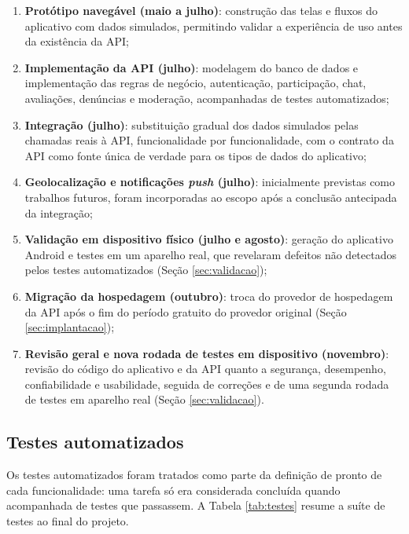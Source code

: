 \documentclass[a4paper, 12pt]{article}
\begin{document}
\begin{justify}
\begin{enumerate}
    \item \textbf{Protótipo navegável (maio a julho)}: construção das telas e fluxos do aplicativo com dados simulados, permitindo validar a experiência de uso antes da existência da API;
    \item \textbf{Implementação da API (julho)}: modelagem do banco de dados e implementação das regras de negócio, autenticação, participação, chat, avaliações, denúncias e moderação, acompanhadas de testes automatizados;
    \item \textbf{Integração (julho)}: substituição gradual dos dados simulados pelas chamadas reais à API, funcionalidade por funcionalidade, com o contrato da API como fonte única de verdade para os tipos de dados do aplicativo;
    \item \textbf{Geolocalização e notificações \textit{push} (julho)}: inicialmente previstas como trabalhos futuros, foram incorporadas ao escopo após a conclusão antecipada da integração;
    \item \textbf{Validação em dispositivo físico (julho e agosto)}: geração do aplicativo Android e testes em um aparelho real, que revelaram defeitos não detectados pelos testes automatizados (Seção \ref{sec:validacao});
    \item \textbf{Migração da hospedagem (outubro)}: troca do provedor de hospedagem da API após o fim do período gratuito do provedor original (Seção \ref{sec:implantacao});
    \item \textbf{Revisão geral e nova rodada de testes em dispositivo (novembro)}: revisão do código do aplicativo e da API quanto a segurança, desempenho, confiabilidade e usabilidade, seguida de correções e de uma segunda rodada de testes em aparelho real (Seção \ref{sec:validacao}).
\end{enumerate}

\subsection{Testes automatizados}

Os testes automatizados foram tratados como parte da definição de pronto de cada funcionalidade: uma tarefa só era considerada concluída quando acompanhada de testes que passassem. A Tabela \ref{tab:testes} resume a suíte de testes ao final do projeto.


\end{justify}
\end{document}
